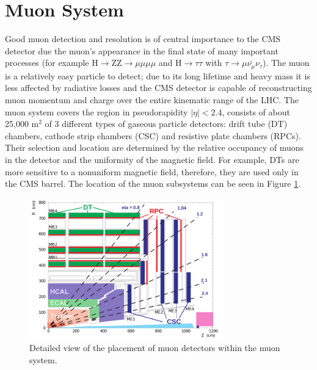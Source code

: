 \section{Muon System}
Good muon detection and resolution is of central importance 
to the CMS detector due the muon's appearance in the final state of many important processes
(for example H$\rightarrow$ZZ$\rightarrow\mu\mu\mu\mu$ and H$\rightarrow\tau\tau$ 
with $\tau\rightarrow\mu\bar{\nu_{\mu}}\nu_{\tau}$). 
The muon is a relatively easy particle to detect; due to its long lifetime 
and heavy mass it is less affected by radiative losses and the
CMS detector is capable of reconstructing muon momentum and charge over the entire
kinematic range of the LHC. The muon system covers the region in pseudorapidity
$|\eta|<2.4$, consists of about 25,000 m$^{2}$ of 3
 different types of gaseous particle detectors: drift tube (DT) chambers, 
 cathode strip chambers (CSC) and resistive plate chambers (RPCs).
 Their selection and location are determined by the relative occupancy
 of muons in the detector and the uniformity of the magnetic field.
 For example, DTs are more sensitive to a nonuniform magnetic field, therefore,
 they are used only in the CMS barrel. The location of the muon subsystems
 can be seen in Figure \ref{fig:muonLayout}. 
 \begin{figure}[hb]
  \centering
	\includegraphics[width=0.75\textwidth]{images/muonSysLayout.png}
  	\caption[Layout of the Muon Sub-Detector]
   	{Detailed view of the placement of muon detectors within the muon system.}
	\label{fig:muonLayout}
\end{figure}
 
